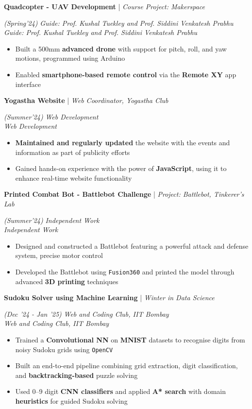 \documentclass[10pt]{article}
\renewcommand{\subsection}[4]{
	\def\temp{#4}
	\vspace{2pt}
	{
		\large
		{\color{Green} \textbf{#1}} | {\sl #2} \filldate{#3}
		\ifx\temp\empty
		\else
		{
			\\[0.098em]
			\fontsize{10.5}{13.2}\selectfont
			\sl #4
		}
		\fi
	}
}
\newcommand{\filldate}[1]{\strut\hfill {\small \textit{(#1)}}}
\begin{document}
\subsection{Quadcopter - UAV Development}{Course Project: Makerspace}{Spring'24}{\textit{Guide: Prof. Kushal Tuekley and Prof. Siddini Venkatesh Prabhu}}  
\begin{itemize}
    \item Built a 500mm \textbf{advanced drone} with support for pitch, roll, and yaw motions, programmed using Arduino  
    \item Enabled \textbf{smartphone-based remote control} via the \textbf{Remote XY} app interface  
\end{itemize}


\subsection{Yogastha Website}{Web Coordinator, Yogastha Club}{Summer'24}{\textit{Web Development}}  
\begin{itemize}
    \item \textbf{Maintained and regularly updated} the website with the events and information as part of publicity efforts
    \item Gained hands-on experience with the power of \textbf{JavaScript}, using it to enhance real-time website functionality
\end{itemize}

\subsection{Printed Combat Bot - Battlebot Challenge}{Project: Battlebot, Tinkerer's Lab}{Summer'24}{\textit{Independent Work}}  
\begin{itemize}
    \item Designed and constructed a Battlebot featuring a powerful attack and defense system, precise motor control
    \item Developed the Battlebot using \texttt{Fusion360} and printed the model through advanced \textbf{3D printing} techniques
\end{itemize}
\subsection{Sudoku Solver using Machine Learning}{Winter in Data Science}{Dec '24 - Jan '25}{\textit{Web and Coding Club, IIT Bombay}}
\begin{itemize}
\item Trained a \textbf{Convolutional NN} on \textbf{MNIST} datasets to recognise digits from noisy Sudoku grids using \texttt{OpenCV}
\item Built an end-to-end pipeline combining grid extraction, digit classification, and \textbf{backtracking-based} puzzle solving
\item Used 0–9 digit \textbf{CNN classifiers} and applied \textbf{A* search} with domain \textbf{heuristics} for guided Sudoku solving
\end{itemize}
\end{document}
